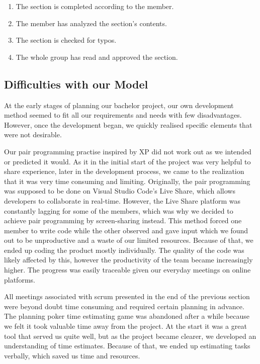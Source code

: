 \begin{enumerate}
    \item The section is completed according to the member.
    \item The member has analyzed the section's contents.
    \item The section is checked for typos.
    \item The whole group has read and approved the section.
\end{enumerate}

\subsection{Difficulties with our Model}
At the early stages of planning our bachelor project, our own development method seemed to fit all our requirements and needs with few disadvantages. However, once the development began, we quickly realised specific elements that were not desirable. 

Our pair programming practise inspired by XP did not work out as we intended or predicted it would. As it in the initial start of the project was very helpful to share experience, later in the development process, we came to the realization that it was very time consuming and limiting. Originally, the pair programming was supposed to be done on Visual Studio Code's Live Share, which allows developers to collaborate in real-time. However, the Live Share platform was constantly lagging for some of the members, which was why we decided to achieve pair programming by screen-sharing instead. This method forced one member to write code while the other observed and gave input which we found out to be unproductive and a waste of our limited resources. Because of that, we ended up coding the product mostly individually. The quality of the code was likely affected by this, however the productivity of the team became increasingly higher. The progress was easily traceable given our everyday meetings on online platforms.   

All meetings associated with scrum presented in the end of the previous section were beyond doubt time consuming and required certain planning in advance. The planning poker time estimating game was abandoned after a while because we felt it took valuable time away from the project. At the start it was a great tool that served us quite well, but as the project became clearer, we developed an understanding of time estimates. Because of that, we ended up estimating tasks verbally, which saved us time and resources.  

